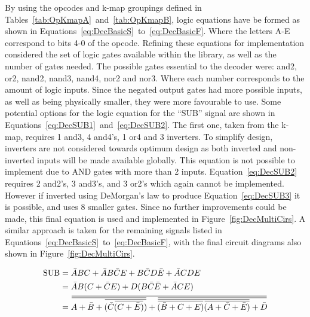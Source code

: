 By using the opcodes and k-map groupings defined in Tables~\ref{tab:OpKmapA}~and~\ref{tab:OpKmapB}, logic equations have be formed as shown in Equations~\ref{eq:DecBasicS}~to~\ref{eq:DecBasicF}. 
Where the letters A-E correspond to bits 4-0 of the opcode. 
Refining these equations for implementation considered the set of logic gates available within the library, as well as the number of gates needed. 
The possible gates essential to the decoder were: and2, or2, nand2, nand3, nand4, nor2 and nor3. Where each number corresponds to the amount of logic inputs. 
Since the negated output gates had more possible inputs, as well as being physically smaller, they were more favourable to use. 
Some potential options for the logic equation for the ``SUB'' signal are shown in Equations~\ref{eq:DecSUB1}~and~\ref{eq:DecSUB2}. 
The first one, taken from the k-map, requires 1 and3, 4 and4's, 1 or4 and 3 inverters. 
To simplify design, inverters are not considered towards optimum design as both inverted and non-inverted inputs will be made available globally. 
This equation is not possible to implement due to AND gates with more than 2 inputs. 
Equation~\ref{eq:DecSUB2} requires 2 and2's, 3 and3's, and 3 or2's which again cannot be implemented. 
However if inverted using DeMorgan's law to produce Equation~\ref{eq:DecSUB3} it is possible, and uses 8 smaller gates. 
Since no further improvements could be made, this final equation is used and implemented in Figure~\ref{fig:DecMultiCirs}. 
A similar approach is taken for the remaining signals listed in Equations~\ref{eq:DecBasicS}~to~\ref{eq:DecBasicF}, with the final circuit diagrams also shown in Figure~\ref{fig:DecMultiCirs}. 

\newcommand{\overbar}[1]{\mkern 1.5mu\overline{\mkern-1.5mu#1\mkern-1.5mu}\mkern 1.5mu}
\begin{align}
	\text{SUB} &= \bar{A}BC + \bar{A}B\bar{C}E + B\bar{C}D\bar{E} + \bar{A}CDE \label{eq:DecSUB1}\\
	&= \bar{A}B(C + \bar{C}E) + D(B\bar{C}\bar{E} + \bar{A}CE) \label{eq:DecSUB2}\\
	&= \overbar{\overbar{A + \bar{B} + \overbar{(\bar{C}\overbar{(C + \bar{E})})}} + \overbar{\overbar{\overbar{(\bar{B} + C + E)}\overbar{(A + \bar{C} + \bar{E})}} + \bar{D}}} \label{eq:DecSUB3}
\end{align}


